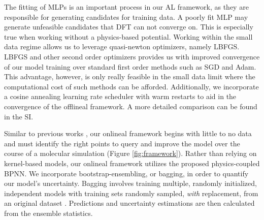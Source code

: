 \documentclass[
 reprint,
 amsmath,
 amssymb,
 aps,
]{revtex4-1}
\begin{document}
The fitting of MLPs is an important process in our AL framework, as they are responsible for generating candidates for training data. A poorly fit MLP may generate unfeasible candidates that DFT can not converge on. This is especially true when working without a physics-based potential. Working within the small data regime allows us to leverage quasi-newton optimizers, namely LBFGS. LBFGS and other second order optimizers provides us with improved convergence of our model training over standard first order methods such as SGD and Adam. This advantage, however, is only really feasible in the small data limit where the computational cost of such methods can be afforded. Additionally, we incorporate a cosine annealing learning rate scheduler with warm restarts \cite{loshchilov2016sgdr} to aid in the convergence of the \gls{offlineal} framework. A more detailed comparison  can be found in the \gls{SI}.

Similar to previous works \cite{Vandermause2020, Jinnouchi2019, Jinnouchi2019}, our \gls{onlineal} framework begins with little to no data and must identify the right points to query and improve the model over the course of a molecular simulation (Figure \ref{fig:framework}). Rather than relying on kernel-based models, our \gls{onlineal} framework utilizes the proposed physics-coupled BPNN. We incorporate bootstrap-ensembling, or bagging, in order to quantify our model's uncertainty. Bagging involves training multiple, randomly initialized, independent models with training sets randomly sampled, \textit{with} replacement, from an original dataset \cite{Peterson2017}. Predictions and uncertainty estimations are then calculated from the ensemble statistics.
\end{document}
